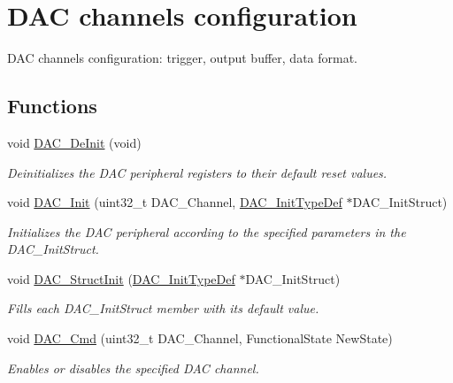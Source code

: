 \hypertarget{group___d_a_c___group1}{\section{D\-A\-C channels configuration}
\label{group___d_a_c___group1}
}


D\-A\-C channels configuration\-: trigger, output buffer, data format.  


\subsection*{Functions}
\begin{DoxyCompactItemize}
\item 
void \hyperlink{group___d_a_c___group1_ga1fae225204e1e049d6795319e99ba8bc}{D\-A\-C\-\_\-\-De\-Init} (void)
\begin{DoxyCompactList}\small\item\em Deinitializes the D\-A\-C peripheral registers to their default reset values. \end{DoxyCompactList}\item 
void \hyperlink{group___d_a_c___group1_ga7c59850468ed4bf0659663fe495441da}{D\-A\-C\-\_\-\-Init} (uint32\-\_\-t D\-A\-C\-\_\-\-Channel, \hyperlink{struct_d_a_c___init_type_def}{D\-A\-C\-\_\-\-Init\-Type\-Def} $\ast$D\-A\-C\-\_\-\-Init\-Struct)
\begin{DoxyCompactList}\small\item\em Initializes the D\-A\-C peripheral according to the specified parameters in the D\-A\-C\-\_\-\-Init\-Struct. \end{DoxyCompactList}\item 
void \hyperlink{group___d_a_c___group1_gadfc270974d54cb5fa5f92556015c4046}{D\-A\-C\-\_\-\-Struct\-Init} (\hyperlink{struct_d_a_c___init_type_def}{D\-A\-C\-\_\-\-Init\-Type\-Def} $\ast$D\-A\-C\-\_\-\-Init\-Struct)
\begin{DoxyCompactList}\small\item\em Fills each D\-A\-C\-\_\-\-Init\-Struct member with its default value. \end{DoxyCompactList}\item 
void \hyperlink{group___d_a_c___group1_ga323e61530d7fa9396c3bce9edb61f733}{D\-A\-C\-\_\-\-Cmd} (uint32\-\_\-t D\-A\-C\-\_\-\-Channel, Functional\-State New\-State)
\begin{DoxyCompactList}\small\item\em Enables or disables the specified D\-A\-C channel. \end{DoxyCompactList}\item 

\end{DoxyCompactItemize}
